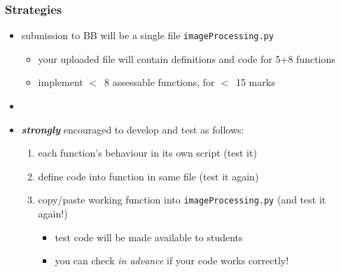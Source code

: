 \documentclass[english,14pt]{beamer}
\begin{document}

\begin{frame}[fragile]

\frametitle{Strategies}

\begin{itemize}
	\item submission to BB will be a single file \texttt{imageProcessing.py}
	\begin{itemize}
		\item your uploaded file will contain definitions and code for 5+8 functions
		\item implement $<$~8 assessable functions, for $<$~15 marks
	\end{itemize}
	\item[]
	
	\item \textbf{\emph{strongly}} encouraged to develop and test as follows:
	\begin{enumerate}
		\item each function's behaviour in its own script (test it)
		\item define code into function in same file (test it again)
		\item copy/paste working function into \texttt{imageProcessing.py} (and test it again!)
		\begin{itemize}
			\item test code will be made available to students
			\item you can check \emph{in advance} if your code works correctly!
	\end{itemize}
	\end{enumerate}
\end{itemize}

\end{frame}

\end{document}
